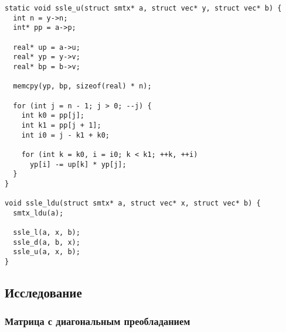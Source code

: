\documentclass[12pt, a4paper]{article}
\begin{document}
\begin{verbatim}
static void ssle_u(struct smtx* a, struct vec* y, struct vec* b) {
  int n = y->n;
  int* pp = a->p;

  real* up = a->u;
  real* yp = y->v;
  real* bp = b->v;

  memcpy(yp, bp, sizeof(real) * n);

  for (int j = n - 1; j > 0; --j) {
    int k0 = pp[j];
    int k1 = pp[j + 1];
    int i0 = j - k1 + k0;

    for (int k = k0, i = i0; k < k1; ++k, ++i)
      yp[i] -= up[k] * yp[j];
  }
}

void ssle_ldu(struct smtx* a, struct vec* x, struct vec* b) {
  smtx_ldu(a);

  ssle_l(a, x, b);
  ssle_d(a, b, x);
  ssle_u(a, x, b);
}
\end{verbatim}

\subsection{Исследование}
\subsubsection{Матрица с диагональным преобладанием}
\end{document}
